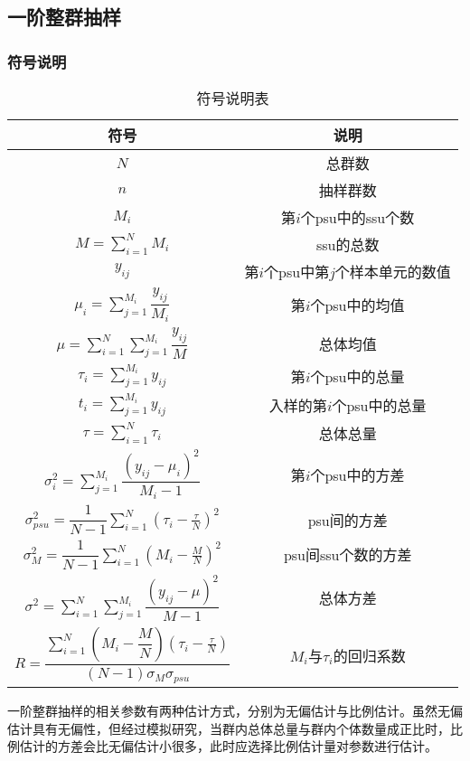\subsection{一阶整群抽样}
\subsubsection{符号说明}
\begin{table}[H]
	\centering
	\setlength{\tabcolsep}{25pt} %
	\renewcommand{\arraystretch}{1.5}
	\begin{tabular}{cc}
		\toprule
		符号    & 说明 \\
		\midrule
		$N$ & 总群数 \\
		$n$ & 抽样群数 \\
		$M_i$ & 第$i$个psu中的ssu个数 \\
		$M=\sum\limits_{i=1}^{N}M_i$ & ssu的总数 \\
		$y_{ij}$ & 第$i$个psu中第$j$个样本单元的数值\\
		$\mu_i=\sum\limits_{j=1}^{M_i}\dfrac{y_{ij}}{M_i}$ & 第$i$个psu中的均值 \\
		$\mu=\sum\limits_{i=1}^{N}\sum_{j=1}^{M_i}\dfrac{y_{ij}}{M}$ & 总体均值 \\
		$\tau_i=\sum\limits_{j=1}^{M_i}y_{ij}$ & 第$i$个psu中的总量 \\
		$t_i=\sum\limits_{j=1}^{M_i}y_{ij}$ & 入样的第$i$个psu中的总量 \\
		$\tau=\sum\limits_{i=1}^{N}\tau_i$ & 总体总量 \\
		$\sigma_i^2=\sum\limits_{j=1}^{M_i}\dfrac{(y_{ij}-\mu_{i})^2}{M_i-1}$ & 第$i$个psu中的方差 \\
		$\sigma_{psu}^2=\dfrac{1}{N-1}\sum\limits_{i=1}^N\left(\tau_i-\frac{\tau}{N}\right)^2$ & psu间的方差 \\
		$\sigma_M^2=\dfrac{1}{N-1}\sum\limits_{i=1}^{N}\left(M_i-\frac{M}{N}\right)^2$ & psu间ssu个数的方差 \\
		$\sigma^2=\sum\limits_{i=1}^N\sum\limits_{j=1}^{M_i}\dfrac{(y_{ij}-\mu)^2}{M-1}$ & 总体方差 \\
		$R=\dfrac{\sum\limits_{i=1}^{N}(M_i-\dfrac{M}{N})(\tau_i-\frac{\tau}{N})}{(N-1)\sigma_{M}\sigma_{psu}}$ & $M_i$与$\tau_i$的回归系数 \\
		\bottomrule
	\end{tabular}
	\caption{符号说明表}
\end{table}
一阶整群抽样的相关参数有两种估计方式，分别为无偏估计与比例估计。虽然无偏估计具有无偏性，但经过模拟研究，当群内总体总量与群内个体数量成正比时，比例估计的方差会比无偏估计小很多，此时应选择比例估计量对参数进行估计。

